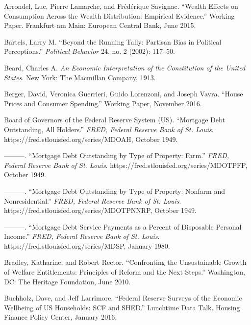 \documentclass[12pt,oneside]{psthesis}
\begin{document}
\leavevmode\hypertarget{ref-arrondel2015wealth}{}%
Arrondel, Luc, Pierre Lamarche, and Frédérique Savignac. ``Wealth Effects on Consumption Across the Wealth Distribution: Empirical Evidence.'' Working Paper. Frankfurt am Main: European Central Bank, June 2015.

\leavevmode\hypertarget{ref-bartels2002running}{}%
Bartels, Larry M. ``Beyond the Running Tally: Partisan Bias in Political Perceptions.'' \emph{Political Behavior} 24, no. 2 (2002): 117--50.

\leavevmode\hypertarget{ref-beard1913economic}{}%
Beard, Charles A. \emph{An Economic Interpretation of the Constitution of the United States}. New York: The Macmillan Company, 1913.

\leavevmode\hypertarget{ref-berger2016house}{}%
Berger, David, Veronica Guerrieri, Guido Lorenzoni, and Joseph Vavra. ``House Prices and Consumer Spending.'' Working Paper, November 2016.

\leavevmode\hypertarget{ref-boardofgovernorsofthefederalreservesystemus1949mortgagec}{}%
Board of Governors of the Federal Reserve System (US). ``Mortgage Debt Outstanding, All Holders.'' \emph{FRED, Federal Reserve Bank of St. Louis}. https://fred.stlouisfed.org/series/MDOAH, October 1949.

\leavevmode\hypertarget{ref-boardofgovernorsofthefederalreservesystemus1949mortgagea}{}%
---------. ``Mortgage Debt Outstanding by Type of Property: Farm.'' \emph{FRED, Federal Reserve Bank of St. Louis}. https://fred.stlouisfed.org/series/MDOTPFP, October 1949.

\leavevmode\hypertarget{ref-boardofgovernorsofthefederalreservesystemus1949mortgageb}{}%
---------. ``Mortgage Debt Outstanding by Type of Property: Nonfarm and Nonresidential.'' \emph{FRED, Federal Reserve Bank of St. Louis}. https://fred.stlouisfed.org/series/MDOTPNNRP, October 1949.

\leavevmode\hypertarget{ref-boardofgovernorsofthefederalreservesystemus1980mortgage}{}%
---------. ``Mortgage Debt Service Payments as a Percent of Disposable Personal Income.'' \emph{FRED, Federal Reserve Bank of St. Louis}. https://fred.stlouisfed.org/series/MDSP, January 1980.

\leavevmode\hypertarget{ref-bradley2010confronting}{}%
Bradley, Katharine, and Robert Rector. ``Confronting the Unsustainable Growth of Welfare Entitlements: Principles of Reform and the Next Steps.'' Washington, DC: The Heritage Foundation, June 2010.

\leavevmode\hypertarget{ref-buchholz2016federal}{}%
Buchholz, Dave, and Jeff Larrimore. ``Federal Reserve Surveys of the Economic Wellbeing of US Households: SCF and SHED.'' Lunchtime Data Talk. Housing Finance Policy Center, January 2016.
\end{document}
